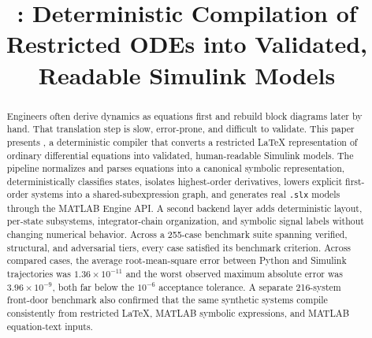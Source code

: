 \documentclass[colorlinks,upint,subscriptcorrection,varvw,balance,nofoot]{asmeconf}
\newcommand{\EqnToSim}{\NoCaseChange{Eqn2Sim}}
\begin{document}

\title{\EqnToSim: Deterministic Compilation of Restricted \NoCaseChange{\LaTeX} ODEs into Validated, Readable Simulink Models}


\maketitle



\begin{abstract}
Engineers often derive dynamics as equations first and rebuild block diagrams later by hand. That translation step is slow, error-prone, and difficult to validate. This paper presents \EqnToSim, a deterministic compiler that converts a restricted \LaTeX{} representation of ordinary differential equations into validated, human-readable Simulink models. The pipeline normalizes and parses equations into a canonical symbolic representation, deterministically classifies states, isolates highest-order derivatives, lowers explicit first-order systems into a shared-subexpression graph, and generates real \texttt{.slx} models through the MATLAB Engine API. A second backend layer adds deterministic layout, per-state subsystems, integrator-chain organization, and symbolic signal labels without changing numerical behavior. Across a 255-case benchmark suite spanning verified, structural, and adversarial tiers, every case satisfied its benchmark criterion. Across compared cases, the average root-mean-square error between Python and Simulink trajectories was $1.36\times10^{-11}$ and the worst observed maximum absolute error was $3.96\times10^{-9}$, both far below the $10^{-6}$ acceptance tolerance. A separate 216-system front-door benchmark also confirmed that the same synthetic systems compile consistently from restricted \LaTeX{}, MATLAB symbolic expressions, and MATLAB equation-text inputs.
\end{abstract}
\end{document}
